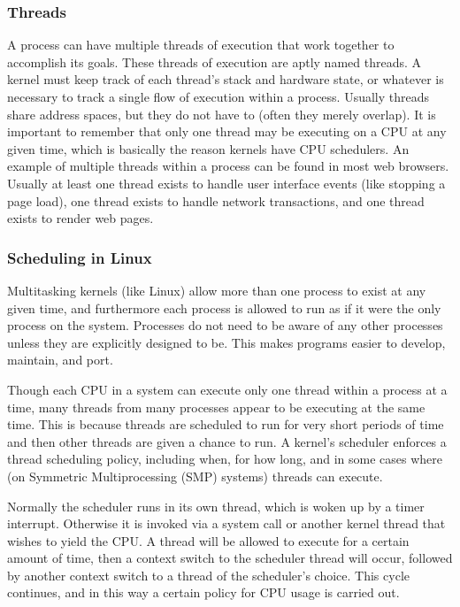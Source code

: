 \subsubsection{Threads}

A process can have multiple threads of execution that work together to
accomplish its goals. These threads of execution are aptly named threads. A
kernel must keep track of each thread's stack and hardware state, or whatever
is necessary to track a single flow of execution within a process. Usually
threads share address spaces, but they do not have to (often they merely
overlap). It is important to remember that only one thread may be executing on
a CPU at any given time, which is basically the reason kernels have CPU
schedulers. An example of multiple threads within a process can be found in
most web browsers. Usually at least one thread exists to handle user interface
events (like stopping a page load), one thread exists to handle network
transactions, and one thread exists to render web pages.

\subsubsection{Scheduling in Linux}

Multitasking kernels (like Linux) allow more than one process to exist at any
given time, and furthermore each process is allowed to run as if it were the
only process on the system. Processes do not need to be aware of any other
processes unless they are explicitly designed to be. This makes programs easier
to develop, maintain, and port.

Though each CPU in a system can execute only one thread within a process at a
time, many threads from many processes appear to be executing at the same time.
This is because threads are scheduled to run for very short periods of time and
then other threads are given a chance to run. A kernel's scheduler enforces a
thread scheduling policy, including when, for how long, and in some cases where
(on Symmetric Multiprocessing (SMP) systems) threads can execute.

Normally the scheduler runs in its own thread, which is woken up by a timer
interrupt. Otherwise it is invoked via a system call or another kernel thread
that wishes to yield the CPU. A thread will be allowed to execute for a certain
amount of time, then a context switch to the scheduler thread will occur,
followed by another context switch to a thread of the scheduler's choice. This
cycle continues, and in this way a certain policy for CPU usage is carried out.

